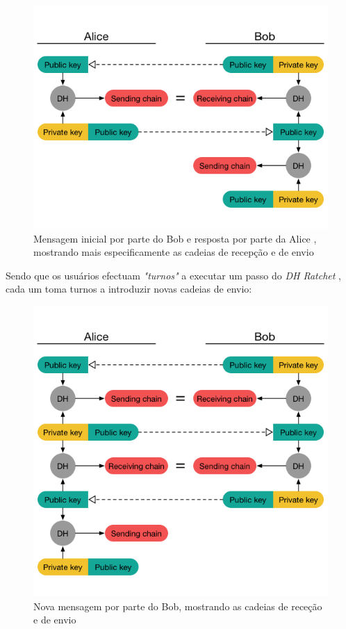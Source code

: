\begin{figure}[H]
\begin{center}
\includegraphics[width=12cm]{img/DH5.png}
\caption{Mensagem inicial por parte do Bob e resposta por parte da Alice , mostrando mais especificamente as cadeias de recepção e de envio}
\label{diagram:DH5}
\centering
\end{center}
\end{figure}

Sendo que os usuários efectuam \textit{"turnos"} a executar um passo do \textit{DH Ratchet} , cada um toma turnos a introduzir novas cadeias de envio:

\begin{figure}[H]
\begin{center}
\includegraphics[width=12cm]{img/DH6.png}
\caption{Nova mensagem por parte do Bob, mostrando as cadeias de receção e de envio}
\label{diagram:DH6}
\centering
\end{center}
\end{figure}

